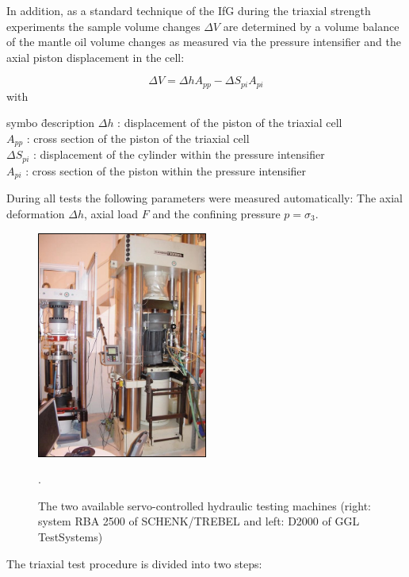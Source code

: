 In addition, as a standard technique of the IfG during the triaxial strength experiments the sample volume changes $\Delta V$ are determined by a volume balance of the mantle oil volume changes as measured via the pressure intensifier and the axial piston displacement in the cell:

\begin{equation}
\Delta V = \Delta h A_{pp} -\Delta S_{pi} A_{pi}
\end{equation}
with
\begin{tabbing}
symbo \= description \kill
$\Delta h$ : \> displacement of the piston of the triaxial cell \\
$A_{pp}$ : \> cross section of the piston of the triaxial cell \\
$\Delta S_{pi}$ : \> displacement of the cylinder within the pressure intensifier \\
$A_{pi}$ : \> cross section of the piston within the pressure intensifier \\
\end{tabbing}

During all tests the following parameters were measured automatically: The axial deformation $\Delta h$, axial load $F$ and the confining pressure $p = \sigma_3$. 

\begin{figure}[!ht]
\centering
\includegraphics[width=0.5\textwidth]{./figures/ifg-lab-photo3.png}
\caption{The two available servo-controlled hydraulic testing machines (right: system RBA 2500 of SCHENK/TREBEL and left: D2000 of GGL TestSystems)}.
\label{fig:ifglabph2}
\end{figure}

The triaxial test procedure is divided into two steps:

